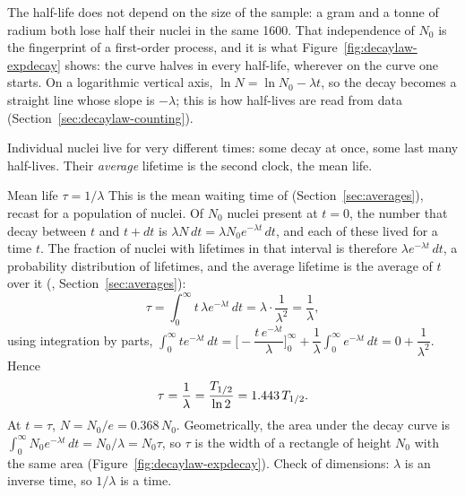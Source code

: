 The half-life does not depend on the size of the sample: a gram and a tonne of radium both lose half
their nuclei in the same \SI{1600}{\year}. That independence of $N_0$ is the fingerprint of a
first-order process, and it is what Figure~\ref{fig:decaylaw-expdecay} shows: the curve halves in every
half-life, wherever on the curve one starts. On a logarithmic vertical axis,
$\ln N=\ln N_0-\lambda t$, so the decay becomes a straight line whose slope is $-\lambda$; this is how
half-lives are read from data (Section~\ref{sec:decaylaw-counting}).

\begin{figure}[htbp]
\centering
{}
\end{figure}

Individual nuclei live for very different times: some decay at once, some last many half-lives. Their
\emph{average} lifetime is the second clock, the mean life.

\begin{derivbox}{Mean life $\tau=1/\lambda$}
This is the mean waiting time of  (Section~\ref{sec:averages}), recast for a
population of nuclei. Of $N_0$ nuclei present at $t=0$, the number that decay between $t$ and $t+dt$ is
$\lambda N\,dt=\lambda N_0e^{-\lambda t}\,dt$, and each of these lived for a time $t$. The fraction of
nuclei with lifetimes in that interval is therefore $\lambda e^{-\lambda t}\,dt$, a probability
distribution of lifetimes, and the average lifetime is the average of $t$ over it
(, Section~\ref{sec:averages}):
\[
\tau=\int_0^\infty t\,\lambda e^{-\lambda t}\,dt=\lambda\cdot\frac{1}{\lambda^2}=\frac1\lambda ,
\]
using integration by parts, $\int_0^\infty te^{-\lambda t}\,dt=\Big[-\dfrac{t\,e^{-\lambda t}}{\lambda}\Big]_0^\infty
+\dfrac1\lambda\displaystyle\int_0^\infty e^{-\lambda t}\,dt=0+\dfrac{1}{\lambda^2}$. Hence
\begin{equation}\label{eq:decaylaw-tau}
\tau=\frac1\lambda=\frac{T_{1/2}}{\ln2}=1.443\,T_{1/2} .
\end{equation}
At $t=\tau$, $N=N_0/e=0.368\,N_0$. Geometrically, the area under the decay curve is
$\int_0^\infty N_0e^{-\lambda t}\,dt=N_0/\lambda=N_0\tau$, so $\tau$ is the width of a rectangle of height $N_0$
with the same area (Figure~\ref{fig:decaylaw-expdecay}). Check of dimensions: $\lambda$ is an inverse
time, so $1/\lambda$ is a time.
\end{derivbox}

